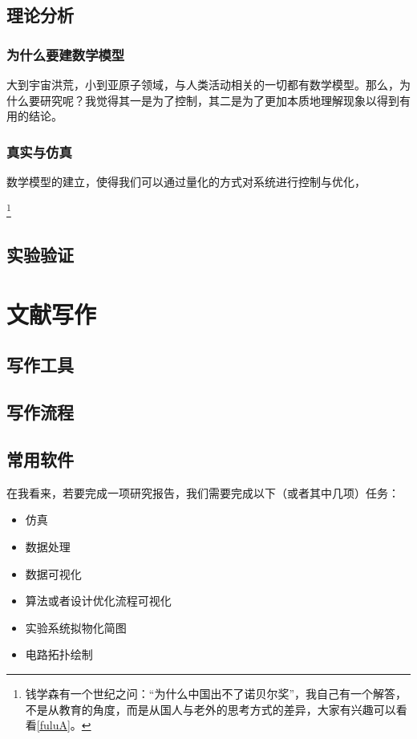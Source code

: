 \documentclass[UTF8,oneside]{ctexbook}
\begin{document}
\section{理论分析}
\subsection{为什么要建数学模型}
大到宇宙洪荒，小到亚原子领域，与人类活动相关的一切都有数学模型。那么，为什么要研究呢？我觉得其一是为了控制，其二是为了更加本质地理解现象以得到有用的结论。

\subsection{真实与仿真}
数学模型的建立，使得我们可以通过量化的方式对系统进行控制与优化，

\footnote{钱学森有一个世纪之问：“为什么中国出不了诺贝尔奖”，我自己有一个解答，不是从教育的角度，而是从国人与老外的思考方式的差异，大家有兴趣可以看看\ref{fuluA}。}

\section{实验验证}

\chapter{文献写作}
\section{写作工具}
\section{写作流程}
\section{常用软件}
在我看来，若要完成一项研究报告，我们需要完成以下（或者其中几项）任务：
\begin{itemize}
	\item 仿真
	\item 数据处理
	\item 数据可视化
	\item 算法或者设计优化流程可视化
	\item 实验系统拟物化简图
	\item 电路拓扑绘制
\end{itemize}
\end{document}
